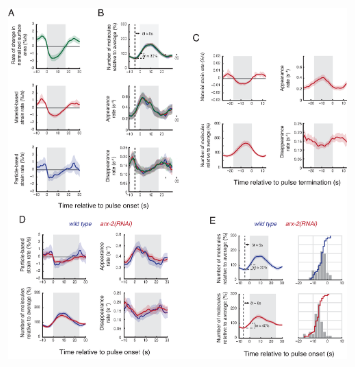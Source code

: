\documentclass{ucetd}
\begin{document}
{{{{%

\begin{figure}[!htbp]
\centering
\includegraphics[width=0.8\textwidth]{Figure2-11}

\end{figure}}}}}
\end{document}
